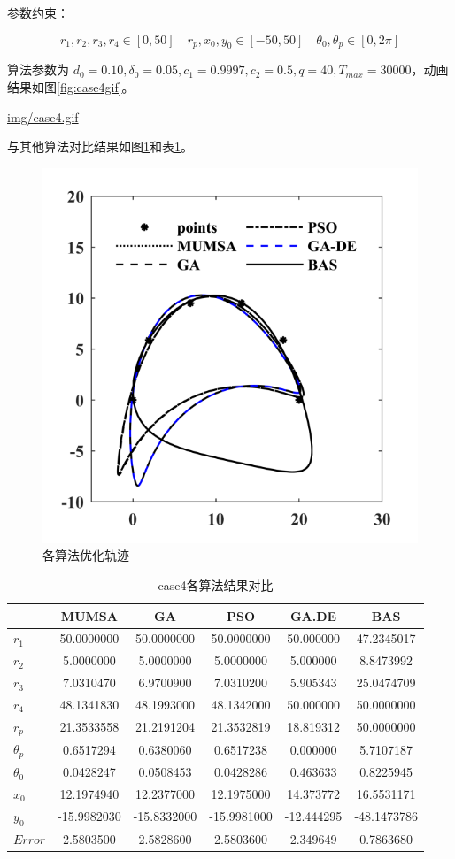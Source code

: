 \documentclass[]{ctexbook}
\begin{document}
参数约束：

\[
r_1,r_2,r_3,r_4\in[0,50]\quad r_p,x_0,y_0\in[-50,50]\quad \theta_0,\theta_p\in[0,2\pi]
\]

算法参数为
\(d_0 = 0.10,\delta_0=0.05,c_1=0.9997,c_2=0.5,q=40,T_{max}=30000\)，动画结果如图\ref{fig:case4gif}。

\url{img/case4.gif}

与其他算法对比结果如图\ref{fig:case4png}和表\ref{tab:case4table}。

\begin{figure}

{\centering \includegraphics[width=0.5\linewidth]{img/case4png} 

}

\caption{各算法优化轨迹}\label{fig:case4png}
\end{figure}

\begin{table}[t]

\caption{\label{tab:case4table}case4各算法结果对比}
\centering
\begin{tabular}{lccccc}
\toprule
  & MUMSA & GA & PSO & GA.DE & BAS\\
\midrule
$r_1$ & 50.0000000 & 50.0000000 & 50.0000000 & 50.000000 & 47.2345017\\
$r_2$ & 5.0000000 & 5.0000000 & 5.0000000 & 5.000000 & 8.8473992\\
$r_3$ & 7.0310470 & 6.9700900 & 7.0310200 & 5.905343 & 25.0474709\\
$r_4$ & 48.1341830 & 48.1993000 & 48.1342000 & 50.000000 & 50.0000000\\
$r_p$ & 21.3533558 & 21.2191204 & 21.3532819 & 18.819312 & 50.0000000\\
\addlinespace
$\theta_p$ & 0.6517294 & 0.6380060 & 0.6517238 & 0.000000 & 5.7107187\\
$\theta_0$ & 0.0428247 & 0.0508453 & 0.0428286 & 0.463633 & 0.8225945\\
$x_0$ & 12.1974940 & 12.2377000 & 12.1975000 & 14.373772 & 16.5531171\\
$y_0$ & -15.9982030 & -15.8332000 & -15.9981000 & -12.444295 & -48.1473786\\
$Error$ & 2.5803500 & 2.5828600 & 2.5803600 & 2.349649 & 0.7863680\\
\bottomrule
\end{tabular}
\end{table}
\end{document}
